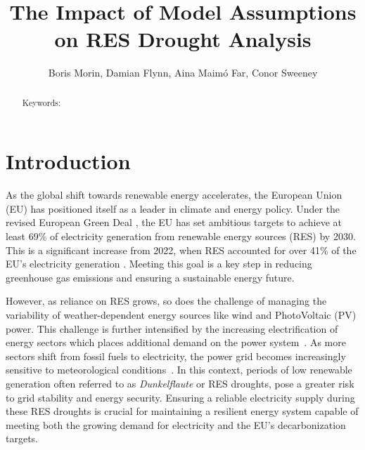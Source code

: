 \documentclass[a4paper, 11pt]{article}
\title{The Impact of Model Assumptions on RES Drought Analysis}
\author{Boris Morin, Damian Flynn, Aina Maimó Far, Conor Sweeney}
\begin{document}
\maketitle

\begin{abstract}


Keywords: 
\end{abstract}

\section{Introduction}
\label{sec:Intro}

As the global shift towards renewable energy accelerates, the European Union (EU) has positioned itself as a leader in climate and energy policy. Under the revised European Green Deal \cite{greendeal2023report}, the EU has set ambitious targets to achieve at least 69\% of electricity generation from renewable energy sources (RES) by 2030. This is a significant increase from 2022, when RES accounted for over 41\% of the EU’s electricity generation \cite{europe2023stat}. Meeting this goal is a key step in reducing greenhouse gas emissions and ensuring a sustainable energy future.

However, as reliance on RES grows, so does the challenge of managing the variability of weather-dependent energy sources like wind and PhotoVoltaic (PV) power. This challenge is further intensified by the increasing electrification of energy sectors which places additional demand on the power system~\cite{bloomfield2021}. As more sectors shift from fossil fuels to electricity, the power grid becomes increasingly sensitive to meteorological conditions~\cite{bloomfield2016, vanderWiel2019drought}. In this context, periods of low renewable generation often referred to as \textit{Dunkelflaute} or RES droughts, pose a greater risk to grid stability and energy security. Ensuring a reliable electricity supply during these RES droughts is crucial for maintaining a resilient energy system capable of meeting both the growing demand for electricity and the EU’s decarbonization targets.
\end{document}
